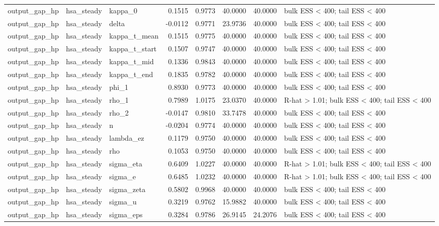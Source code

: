 \begin{tabular}{lllrrrrl}
output\_gap\_hp & hsa\_steady & kappa\_0 & 0.1515 & 0.9773 & 40.0000 & 40.0000 & bulk ESS < 400; tail ESS < 400 \\
output\_gap\_hp & hsa\_steady & delta & -0.0112 & 0.9771 & 23.9736 & 40.0000 & bulk ESS < 400; tail ESS < 400 \\
output\_gap\_hp & hsa\_steady & kappa\_t\_mean & 0.1515 & 0.9775 & 40.0000 & 40.0000 & bulk ESS < 400; tail ESS < 400 \\
output\_gap\_hp & hsa\_steady & kappa\_t\_start & 0.1507 & 0.9747 & 40.0000 & 40.0000 & bulk ESS < 400; tail ESS < 400 \\
output\_gap\_hp & hsa\_steady & kappa\_t\_mid & 0.1336 & 0.9843 & 40.0000 & 40.0000 & bulk ESS < 400; tail ESS < 400 \\
output\_gap\_hp & hsa\_steady & kappa\_t\_end & 0.1835 & 0.9782 & 40.0000 & 40.0000 & bulk ESS < 400; tail ESS < 400 \\
output\_gap\_hp & hsa\_steady & phi\_1 & 0.8930 & 0.9773 & 40.0000 & 40.0000 & bulk ESS < 400; tail ESS < 400 \\
output\_gap\_hp & hsa\_steady & rho\_1 & 0.7989 & 1.0175 & 23.0370 & 40.0000 & R-hat > 1.01; bulk ESS < 400; tail ESS < 400 \\
output\_gap\_hp & hsa\_steady & rho\_2 & -0.0147 & 0.9810 & 33.7478 & 40.0000 & bulk ESS < 400; tail ESS < 400 \\
output\_gap\_hp & hsa\_steady & n & -0.0204 & 0.9774 & 40.0000 & 40.0000 & bulk ESS < 400; tail ESS < 400 \\
output\_gap\_hp & hsa\_steady & lambda\_ez & 0.1179 & 0.9750 & 40.0000 & 40.0000 & bulk ESS < 400; tail ESS < 400 \\
output\_gap\_hp & hsa\_steady & rho & 0.1053 & 0.9750 & 40.0000 & 40.0000 & bulk ESS < 400; tail ESS < 400 \\
output\_gap\_hp & hsa\_steady & sigma\_eta & 0.6409 & 1.0227 & 40.0000 & 40.0000 & R-hat > 1.01; bulk ESS < 400; tail ESS < 400 \\
output\_gap\_hp & hsa\_steady & sigma\_e & 0.6485 & 1.0232 & 40.0000 & 40.0000 & R-hat > 1.01; bulk ESS < 400; tail ESS < 400 \\
output\_gap\_hp & hsa\_steady & sigma\_zeta & 0.5802 & 0.9968 & 40.0000 & 40.0000 & bulk ESS < 400; tail ESS < 400 \\
output\_gap\_hp & hsa\_steady & sigma\_u & 0.3219 & 0.9762 & 15.9882 & 40.0000 & bulk ESS < 400; tail ESS < 400 \\
output\_gap\_hp & hsa\_steady & sigma\_eps & 0.3284 & 0.9786 & 26.9145 & 24.2076 & bulk ESS < 400; tail ESS < 400 \\

\end{tabular}
